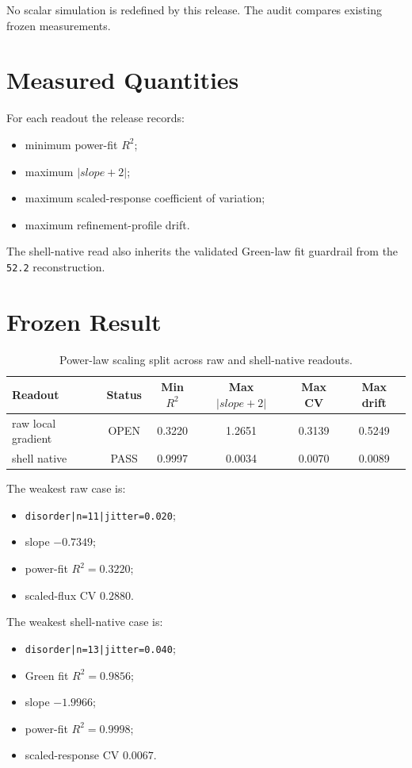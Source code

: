 \documentclass[11pt]{article}
\begin{document}
No scalar simulation is redefined by this release. The audit compares existing frozen measurements.

\section{Measured Quantities}

For each readout the release records:
\begin{itemize}
\item minimum power-fit \(R^2\);
\item maximum \(|slope + 2|\);
\item maximum scaled-response coefficient of variation;
\item maximum refinement-profile drift.
\end{itemize}

The shell-native read also inherits the validated Green-law fit guardrail from the \texttt{52.2} reconstruction.

\section{Frozen Result}

\begin{table}[h!]
\centering
\begin{tabular}{@{}lccccc@{}}
\toprule
Readout & Status & Min \(R^2\) & Max \(|slope+2|\) & Max CV & Max drift \\
\midrule
raw local gradient & OPEN & 0.3220 & 1.2651 & 0.3139 & 0.5249 \\
shell native & PASS & 0.9997 & 0.0034 & 0.0070 & 0.0089 \\
\bottomrule
\end{tabular}
\caption{Power-law scaling split across raw and shell-native readouts.}
\end{table}

The weakest raw case is:
\begin{itemize}
\item \texttt{disorder|n=11|jitter=0.020};
\item slope \(-0.7349\);
\item power-fit \(R^2 = 0.3220\);
\item scaled-flux CV \(0.2880\).
\end{itemize}

The weakest shell-native case is:
\begin{itemize}
\item \texttt{disorder|n=13|jitter=0.040};
\item Green fit \(R^2 = 0.9856\);
\item slope \(-1.9966\);
\item power-fit \(R^2 = 0.9998\);
\item scaled-response CV \(0.0067\).
\end{itemize}
\end{document}
